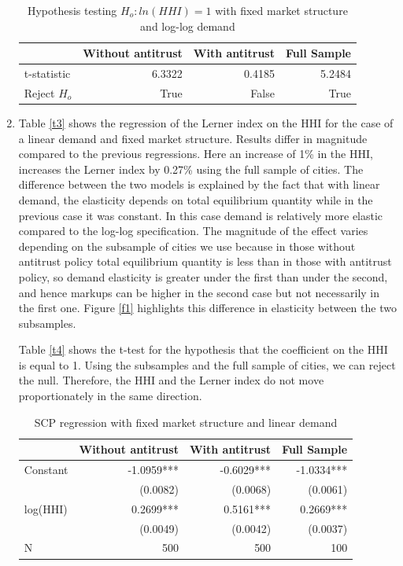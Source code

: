 \documentclass[11pt,english]{article}
\begin{document}
\begin{enumerate}
\begin{table}[H]
  \centering
  \caption{Hypothesis testing $H_{o}: ln(HHI)=1$ with fixed market structure and log-log demand}
    \begin{tabular}{lrrr}
    \hline
          & Without antitrust & With antitrust & Full Sample \\
    \hline
    t-statistic & 6.3322 & 0.4185 & 5.2484 \\
      Reject $H_{o}$    & True & False & True \\
    \hline
    \end{tabular}%
  \label{t2}%
\end{table}

\item Table \eqref{t3} shows the regression of the Lerner index on the HHI for the case of a linear demand and fixed market structure. Results differ in magnitude compared to the previous regressions. Here an increase of 1\% in the HHI, increases the Lerner index by 0.27\% using the full sample of cities. The difference between the two models is explained by the fact that with linear demand, the elasticity depends on total equilibrium quantity while in the previous case it was constant. In this case demand is relatively more elastic compared to the log-log specification. The magnitude of the effect varies depending on the subsample of cities we use because in those without antitrust policy total equilibrium quantity is less than in those with antitrust policy, so demand elasticity is greater under the first than under the second, and hence markups can be higher in the second case but not necessarily in the first one. Figure \eqref{f1} highlights this difference in elasticity between the two subsamples.

Table \eqref{t4} shows the t-test for the hypothesis that the coefficient on the HHI is equal to 1. Using the subsamples and the full sample of cities, we can reject the null. Therefore, the HHI and the Lerner index do not move proportionately in the same direction.

\begin{table}[H]
  \centering
  \caption{SCP regression with fixed market structure and linear demand}
    \begin{tabular}{lrrr}
    \hline
          & Without antitrust & With antitrust & Full Sample \\
    \hline
    Constant & -1.0959*** & -0.6029*** & -1.0334*** \\
        & (0.0082) & (0.0068) & (0.0061) \\
    log(HHI) & 0.2699*** & 0.5161*** & 0.2669*** \\
        & (0.0049) & (0.0042) & (0.0037) \\
                N & 500&500 &100\\
    \hline
    \end{tabular}%
  \label{t3}%
\end{table}


\end{enumerate}
\end{document}
